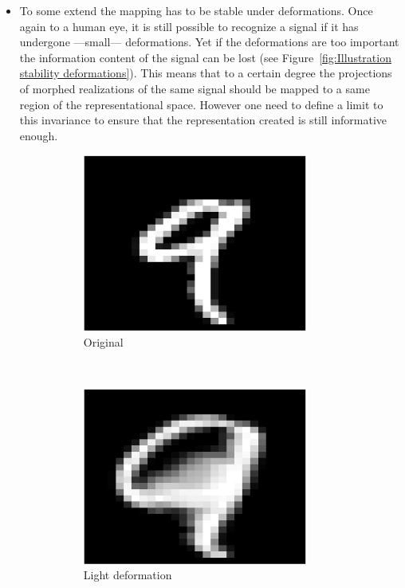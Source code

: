 \documentclass[a4paper,11pt]{report}
\begin{document}
\begin{itemize}
				\item To some extend the mapping has to be stable under deformations. Once again to a human eye, it is still possible to recognize a signal if it has undergone ---small--- deformations. Yet if the deformations are too important the information content of the signal can be lost (see Figure~\ref{fig:Illustration stability deformations}). This means that to a certain degree the projections of morphed realizations of the same signal should be mapped to a same region of the representational space. However one need to define a limit to this invariance to ensure that the representation created is still informative enough.\\
				
				\begin{figure}[h]
					\centering
					\begin{subfigure}[t]{0.48\textwidth}
						\centering
						\includegraphics[height=2.3in]{im_nine_ori.eps}
						\caption{\centering Original}
					\end{subfigure}%
					~
					\begin{subfigure}[t]{0.48\textwidth}
						\centering
						\includegraphics[height=2.3in]{im_nine_def_Vsmall.eps}
						\caption{\centering Light deformation}
					\end{subfigure}%
					\\
					~
					\begin{subfigure}[t]{0.48\textwidth}

\end{subfigure}
\end{figure}
\end{itemize}
\end{document}
